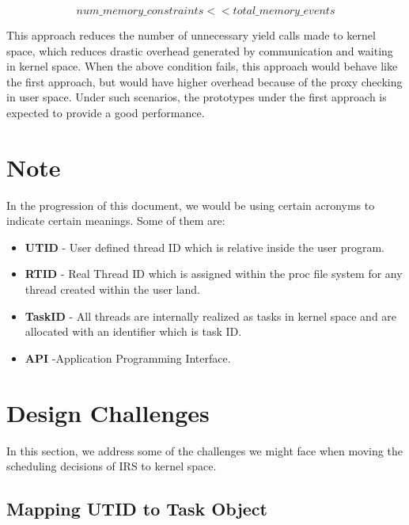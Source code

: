 \begin{equation}
num\_memory\_constraints << total\_memory\_events
\label{mem_cond}
\end{equation}


This approach reduces the number of unnecessary yield calls made to kernel space, which reduces drastic overhead generated by communication and waiting in kernel space. 
When the above condition fails, this approach would behave like the first approach, but would have higher overhead because of the proxy checking in user space. 
Under such scenarios, the prototypes under the first approach is expected to provide a good performance. 


\section*{Note}
In the progression of this document, we would be using certain acronyms to indicate certain meanings. 
Some of them are:
\begin{itemize}
\item \textbf{UTID} - User defined thread ID which is relative inside the user program. 
\item \textbf{RTID} - Real Thread ID which is assigned within the proc file system for any thread created within the user land. 
\item \textbf{TaskID} - All threads are internally realized as tasks in kernel space and are allocated with an identifier which is task ID.
\item \textbf{API} -Application Programming Interface.
\end{itemize}

\section{Design Challenges}

In this section, we address some of the challenges we might face when moving the scheduling decisions of IRS to kernel space.

\subsection{Mapping UTID to Task Object}

